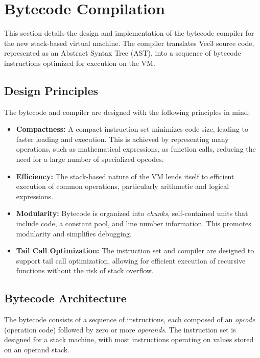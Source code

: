 \section{Bytecode Compilation}
\label{sec:bytecode-compilation}

This section details the design and implementation of the bytecode compiler for the new stack-based virtual machine.
The compiler translates Vec3 source code, represented as an Abstract Syntax Tree (AST), into a sequence of bytecode instructions optimized for execution on the VM\@.

\subsection{Design Principles}\label{subsec:design-principles}

The bytecode and compiler are designed with the following principles in mind:

\begin{itemize}
    \item \textbf{Compactness:} A compact instruction set minimizes code size, leading to faster loading and execution.
    This is achieved by representing many operations, such as mathematical expressions, as function calls, reducing the need for a large number of specialized opcodes.
    \item \textbf{Efficiency:} The stack-based nature of the VM lends itself to efficient execution of common operations, particularly arithmetic and logical expressions.
    \item \textbf{Modularity:} Bytecode is organized into \textit{chunks}, self-contained units that include code, a constant pool, and line number information.
    This promotes modularity and simplifies debugging.
    \item \textbf{Tail Call Optimization:} The instruction set and compiler are designed to support tail call optimization, allowing for efficient execution of recursive functions without the risk of stack overflow.
\end{itemize}

\subsection{Bytecode Architecture}\label{subsec:bytecode-architecture}

The bytecode consists of a sequence of instructions, each composed of an \textit{opcode} (operation code) followed by zero or more \textit{operands}.
The instruction set is designed for a stack machine, with most instructions operating on values stored on an operand stack.

